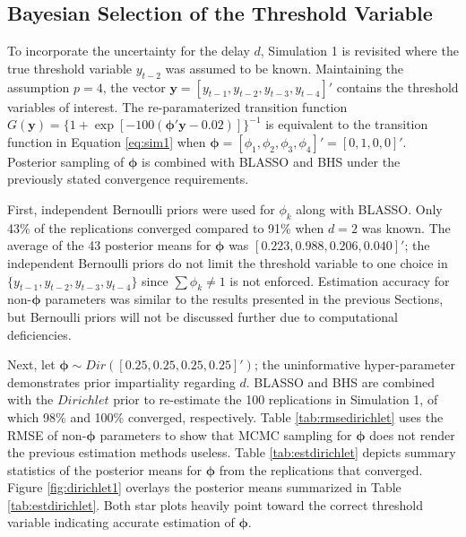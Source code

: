\vskip 3mm

\subsection{Bayesian Selection of the Threshold Variable}

To incorporate the uncertainty for the delay $d$, Simulation 1 is revisited where the true threshold variable $y_{t-2}$ was assumed to be known. Maintaining the assumption $p = 4$, the vector $\bm{y}=[y_{t-1},y_{t-2},y_{t-3},y_{t-4}]'$ contains the threshold variables of interest. The re-paramaterized transition function $G(\bm{y})=\{1+\exp[-100(\bm{\phi}'\bm{y}-0.02)]\}^{-1}$ is equivalent to the transition function in Equation \ref{eq:sim1} when $\bm{\phi}=[\phi_1,\phi_2,\phi_3,\phi_4]'=[0,1,0,0]'$. Posterior sampling of $\bm{\phi}$ is combined with BLASSO and BHS under the previously stated convergence requirements. 

First, independent Bernoulli priors were used for $\phi_k$ along with BLASSO. Only 43\% of the replications converged compared to 91\% when $d=2$ was known. The average of the 43 posterior means for $\bm{\phi}$ was $[0.223,0.988,0.206,0.040]'$; the independent Bernoulli priors do not limit the threshold variable to one choice in  $\{y_{t-1},y_{t-2},y_{t-3},y_{t-4}\}$ since $\sum \phi_k \neq 1$ is not enforced. Estimation accuracy for non-$\bm{\phi}$ parameters was similar to the results presented in the previous Sections, but Bernoulli priors will not be discussed further due to computational deficiencies.

Next, let $\bm{\phi}\sim Dir([0.25,0.25,0.25,0.25]')$; the uninformative hyper-parameter demonstrates prior impartiality regarding $d$. BLASSO and BHS are combined with the $Dirichlet$ prior to re-estimate the 100 replications in Simulation 1, of which 98\% and 100\% converged, respectively. Table \ref{tab:rmsedirichlet} uses the RMSE of non-$\bm{\phi}$ parameters to show that MCMC sampling for $\bm{\phi}$ does not render the previous estimation methods useless. Table \ref{tab:estdirichlet} depicts summary statistics of the posterior means for $\bm{\phi}$ from the replications that converged. Figure \ref{fig:dirichlet1} overlays the posterior means summarized in Table \ref{tab:estdirichlet}. Both star plots heavily point toward the correct threshold variable indicating accurate estimation of $\bm{\phi}$. 
 
